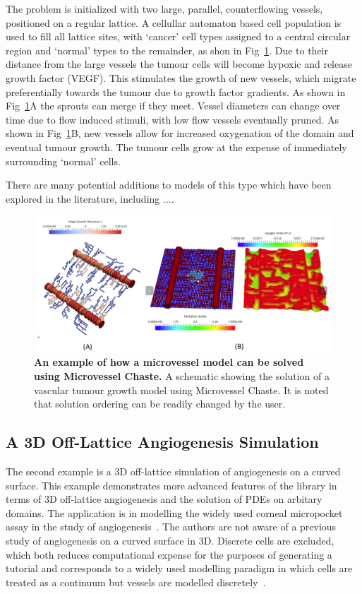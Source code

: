 \documentclass[10pt,letterpaper]{article}
\begin{document}
The problem is initialized with two large, parallel, counterflowing vessels, positioned on a regular lattice. A cellullar automaton based cell population is used to fill all lattice sites, with `cancer' cell types assigned to a central circular region and `normal' types to the remainder, as shon in Fig~\ref{fig3}. Due to their distance from the large vessels the tumour cells will become hypoxic and release growth factor (VEGF). This stimulates the growth of new vessels, which  migrate preferentially towards the tumour due to growth factor gradients. As shown in Fig~\ref{fig3}A the sprouts can merge if they meet. Vessel diameters can change over time due to flow induced stimuli, with low flow vessels eventually pruned. As shown in Fig~\ref{fig3}B, new vessels allow for increased oxygenation of the domain and eventual tumour growth. The tumour cells grow at the expense of immediately surrounding `normal' cells.

There are many potential additions to models of this type which have been explored in the literature, including ....

\begin{figure}[!h]
\centering
\includegraphics[width=0.99\textwidth]{Fig3.png}
\caption{{\bf An example of how a microvessel model can be solved using Microvessel Chaste.}
A schematic showing the solution of a vascular tumour growth model using Microvessel Chaste. It is noted that solution ordering can be readily changed by the user.}
\label{fig3}
\end{figure}

\subsection*{A 3D Off-Lattice Angiogenesis Simulation}

The second example is a 3D off-lattice simulation of angiogenesis on a curved surface. This example demonstrates more advanced features of the library in terms of 3D off-lattice angiogenesis and the solution of PDEs on arbitary domains. The application is in modelling the widely used corneal micropocket assay in the study of angiogenesis~\cite{Connor2015}. The authors are not aware of a previous study of angiogenesis on a curved surface in 3D. Discrete cells are excluded, which both reduces computational expense for the purposes of generating a tutorial and corresponds to a widely used modelling paradigm in which cells are treated as a continuum but vessels are modelled discretely~\cite{Secomb2013}.
\end{document}
